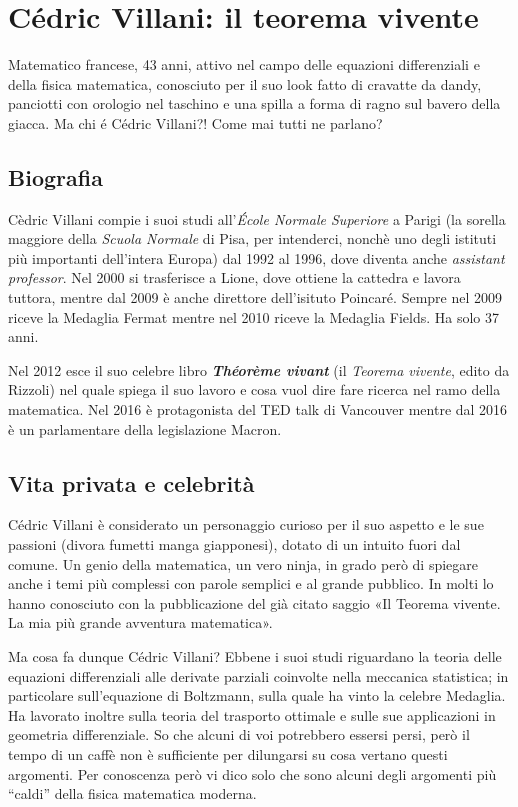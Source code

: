 
\chapter{Cédric Villani: il teorema vivente}
Matematico francese, 43 anni, attivo nel campo delle equazioni differenziali e della fisica matematica, conosciuto per il suo look fatto di cravatte da dandy, panciotti con orologio nel taschino e una spilla a forma di ragno sul bavero della giacca. Ma chi é Cédric Villani?! Come mai tutti ne parlano?
\section{Biografia}

Cèdric Villani compie i suoi studi all’\emph{École Normale Superiore} a Parigi (la sorella maggiore della \emph{Scuola Normale} di Pisa, per intenderci, nonchè uno degli istituti più importanti dell’intera Europa) dal 1992 al 1996, dove diventa anche \emph{assistant professor}. Nel 2000 si trasferisce a Lione, dove ottiene la cattedra e lavora tuttora, mentre dal 2009 è anche direttore dell’isituto Poincaré.
Sempre nel 2009 riceve la Medaglia Fermat mentre nel 2010 riceve la Medaglia Fields. Ha solo 37 anni.

Nel 2012 esce il suo celebre libro \emph{\textbf{Théorème vivant}} (il \emph{Teorema vivente}, edito da Rizzoli) nel quale spiega il suo lavoro e cosa vuol dire fare ricerca nel ramo della matematica. Nel 2016 è protagonista del TED talk di Vancouver mentre dal 2016 è un parlamentare della legislazione Macron.

\section{Vita privata e celebrità}
Cédric Villani è considerato un personaggio curioso per il suo aspetto e le sue passioni (divora fumetti manga giapponesi), dotato di un intuito fuori dal comune. Un genio della matematica, un vero ninja, in grado però di spiegare anche i temi più complessi con parole semplici e al grande pubblico. In molti lo hanno conosciuto con la pubblicazione del già citato saggio «Il Teorema vivente. La mia più grande avventura matematica».

Ma cosa fa dunque Cédric Villani? Ebbene i suoi studi riguardano la teoria delle equazioni differenziali alle derivate parziali coinvolte nella meccanica statistica; in particolare sull’equazione di Boltzmann, sulla quale ha vinto la celebre Medaglia. Ha lavorato inoltre sulla teoria del trasporto ottimale e sulle sue applicazioni in geometria differenziale. So che alcuni di voi potrebbero essersi persi, però il tempo di un caffè non è sufficiente per dilungarsi su cosa vertano questi argomenti. Per conoscenza però vi dico solo che sono alcuni degli argomenti più “caldi” della fisica matematica moderna.
